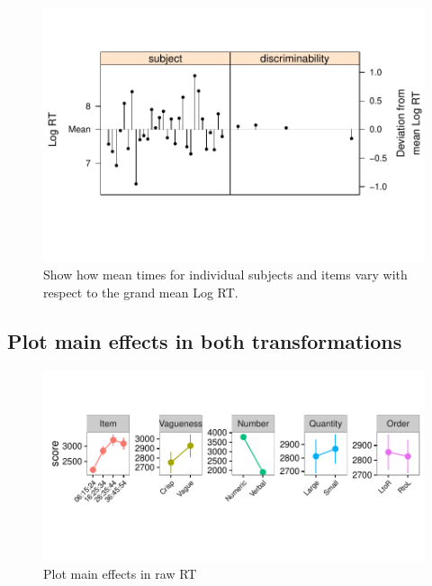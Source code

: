 \documentclass[a4paper,12pt,twoside]{article}\usepackage[]{graphicx}\usepackage[]{color}
\makeatletter
\def\maxwidth{ %
  \ifdim\Gin@nat@width>\linewidth
    \linewidth
  \else
    \Gin@nat@width
  \fi
}
\newenvironment{knitrout}{}{} %
\makeatother
\begin{document}
\begin{knitrout}\scriptsize
{}\color{fgcolor}\begin{figure}[hbtp]

{\centering \includegraphics[width=\maxwidth]{figure/graphics-plotFastSlowRTs-1} 

}

\caption[Show how mean times for individual subjects and items vary with respect to the grand mean Log RT]{Show how mean times for individual subjects and items vary with respect to the grand mean Log RT.}\label{fig:plotFastSlowRTs}
\end{figure}


\end{knitrout}

\clearpage
\subsection{Plot main effects in both transformations}



  
\begin{knitrout}\scriptsize
{}\color{fgcolor}\begin{figure}[hbtp]

{\centering \includegraphics[width=\maxwidth]{figure/graphics-plotMainEffectsRaw-1} 

}

\caption[Plot main effects in raw RT]{Plot main effects in raw RT}\label{fig:plotMainEffectsRaw}
\end{figure}


\end{knitrout}
  
\end{document}
